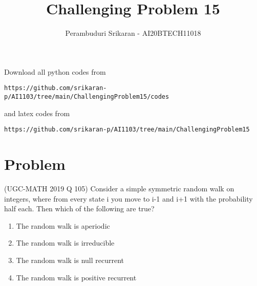 \documentclass[journal,12pt,twocolumn]{IEEEtran}
\begin{document}
\let\StandardTheFigure\thefigure
\let\vec\mathbf
\renewcommand{\thefigure}{\theproblem}
\def\putbox#1#2#3{\makebox[0in][l]{\makebox[#1][l]{}\raisebox{\baselineskip}[0in][0in]{\raisebox{#2}[0in][0in]{#3}}}}
     \def\rightbox#1{\makebox[0in][r]{#1}}
     \def\centbox#1{\makebox[0in]{#1}}
     \def\topbox#1{\raisebox{-\baselineskip}[0in][0in]{#1}}
     \def\midbox#1{\raisebox{-0.5\baselineskip}[0in][0in]{#1}}
\vspace{3cm}
\title{Challenging Problem 15}
\author{Perambuduri Srikaran - AI20BTECH11018}
\maketitle
\newpage
\bigskip
\renewcommand{\thefigure}{\theenumi}
\renewcommand{\thetable}{\theenumi}
Download all python codes from
\begin{lstlisting}
https://github.com/srikaran-p/AI1103/tree/main/ChallengingProblem15/codes
\end{lstlisting}
and latex codes from 
\begin{lstlisting}
https://github.com/srikaran-p/AI1103/tree/main/ChallengingProblem15
\end{lstlisting}
\section*{Problem}
(UGC-MATH 2019 Q 105) Consider a simple symmetric random walk on integers, where from every state i you move to i-1 and i+1 with the probability half each. Then which of the following are true?
\begin{enumerate}
\item The random walk is aperiodic
\item The random walk is irreducible
\item The random walk is null recurrent 
\item The random walk is positive recurrent
\end{enumerate}
\end{document}
